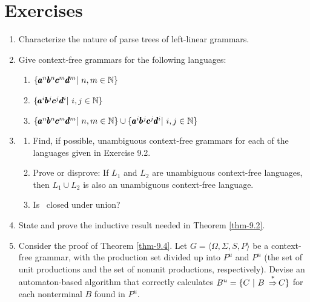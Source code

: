 \section*{Exercises}
\begin{enumerate}[{9.}1.]
\item Characterize the nature of parse trees of left-linear grammars.

\item Give context-free grammars for the following languages:
\begin{enumerate}
\item $\{\pmb{a}^n\pmb{b}^n\pmb{c}^m\pmb{d}^m|\ n,m\in\NN\}$
\item $\{\pmb{a}^i\pmb{b}^j\pmb{c}^j\pmb{d}^i|\ i,j\in\NN\}$
\item $\{\pmb{a}^n\pmb{b}^n\pmb{c}^m\pmb{d}^m|\ n,m\in\NN\}\cup\{\pmb{a}^i\pmb{b}^j
\pmb{c}^j\pmb{d}^i|\ i,j\in\NN\}$
\end{enumerate}

\item \begin{enumerate}
\item Find, if possible, unambiguous context-free grammars for each of the
languages given in Exercise 9.2.
\item Prove or disprove: If $L_1$ and $L_2$ are unambiguous context-free
languages, then $L_1 \cup L_2$ is also an unambiguous context-free language.
\item Is \USIG\ closed under union?
\end{enumerate}

\item State and prove the inductive result needed in Theorem \ref{thm-9.2}.

\item Consider the proof of Theorem \ref{thm-9.4}. Let $G=\langle\Omega,\Sigma,S,P\rangle$
be a context-free grammar, with the production set divided up into $P^u$ and
$P^n$ (the set of unit productions and the set of nonunit productions,
respectively). Devise an automaton-based algorithm that correctly calculates
$B^u = \{C\ |\ B\ \operatorname{\overset{*}{\Rightarrow}} C\}$ for each nonterminal $B$ found in $P^u$.


\end{enumerate}
